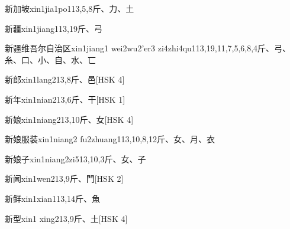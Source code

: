 \begin{entry}{新加坡}{xin1jia1po1}{13,5,8}{⽄、⼒、⼟}
\end{entry}

\begin{entry}{新疆}{xin1jiang1}{13,19}{⽄、⼸}
\end{entry}

\begin{entry}{新疆维吾尔自治区}{xin1jiang1 wei2wu2'er3 zi4zhi4qu1}{13,19,11,7,5,6,8,4}{⽄、⼸、⽷、⼝、⼩、⾃、⽔、⼖}
\end{entry}

\begin{entry}{新郎}{xin1lang2}{13,8}{⽄、⾢}[HSK 4]
\end{entry}

\begin{entry}{新年}{xin1nian2}{13,6}{⽄、⼲}[HSK 1]
\end{entry}

\begin{entry}{新娘}{xin1niang2}{13,10}{⽄、⼥}[HSK 4]
\end{entry}

\begin{entry}{新娘服装}{xin1niang2 fu2zhuang1}{13,10,8,12}{⽄、⼥、⽉、⾐}
\end{entry}

\begin{entry}{新娘子}{xin1niang2zi5}{13,10,3}{⽄、⼥、⼦}
\end{entry}

\begin{entry}{新闻}{xin1wen2}{13,9}{⽄、⾨}[HSK 2]
\end{entry}

\begin{entry}{新鲜}{xin1xian1}{13,14}{⽄、⿂}
\end{entry}

\begin{entry}{新型}{xin1 xing2}{13,9}{⽄、⼟}[HSK 4]
\end{entry}

